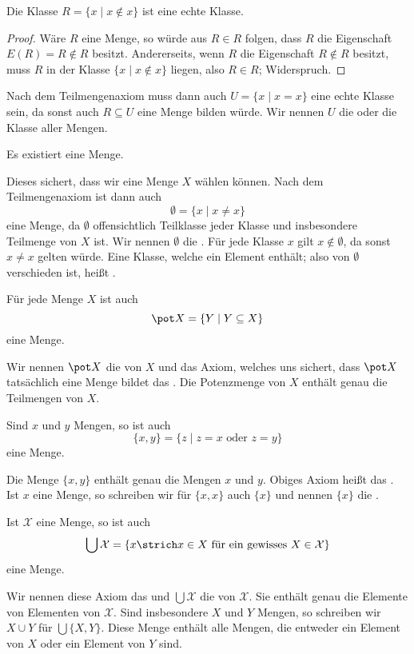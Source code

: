 \begin{lemma}
Die Klasse $R=\{x\mid x\notin x\}$ ist eine echte Klasse.
\begin{proof}
Wäre $R$ eine Menge, so würde aus $R\in R$ folgen, dass $R$ die Eigenschaft $E(R)=R\notin R$ besitzt. Andererseits, wenn $R$ die Eigenschaft $R\notin R$ besitzt, muss $R$ in der Klasse $\{x\mid x\notin x\}$ liegen, also $R\in R$; Widerspruch.
\end{proof}
\end{lemma}

Nach dem Teilmengenaxiom muss dann auch $U=\{x\mid x=x\}$ eine echte Klasse sein, da sonst auch $R\subseteq U$ eine Menge bilden würde. Wir nennen $U$ die  oder die Klasse aller Mengen.

\begin{axiom}
Es existiert eine Menge.
\end{axiom}

Dieses  sichert, dass wir eine Menge $X$ wählen können. Nach dem Teilmengenaxiom ist dann auch
\[\emptyset=\{x\mid x\not= x\}\] eine Menge, da $\emptyset$ offensichtlich Teilklasse jeder Klasse und insbesondere Teilmenge von $X$ ist. Wir nennen $\emptyset$ die . Für jede Klasse $x$ gilt $x\notin\emptyset$, da sonst $x\not= x$ gelten würde. Eine Klasse, welche ein Element enthält; also von $\emptyset$ verschieden ist, heißt .

\begin{axiom}
Für jede Menge $X$ ist auch
\[
\pot X=\{Y\mid Y\subseteq X\}
\]
eine Menge.
\end{axiom}
Wir nennen $\pot X$ die  von $X$ und das Axiom, welches uns sichert, dass $\pot X$ tatsächlich eine Menge bildet das . Die Potenzmenge von $X$ enthält genau die Teilmengen von $X$.

\begin{axiom}
Sind $x$ und $y$ Mengen, so ist auch
\[
\{x,y\}=\{z\mid z=x\text{ oder }z=y\}\]
eine Menge.
\end{axiom}
Die Menge $\{x,y\}$ enthält genau die Mengen $x$ und $y$. Obiges Axiom heißt das . Ist $x$ eine Menge, so schreiben wir für $\{x,x\}$ auch $\{x\}$ und nennen $\{x\}$ die .

\begin{axiom}
Ist $\mathcal{X}$ eine Menge, so ist auch
\[
\bigcup\mathcal{X}=\left\{x\strich x\in X\text{ für ein gewisses }X\in\mathcal{X}\right\}
\]
eine Menge.
\end{axiom}
Wir nennen diese Axiom das  und $\bigcup\mathcal{X}$ die  von $\mathcal{X}$. Sie enthält genau die Elemente von Elementen von $\mathcal{X}$. Sind insbesondere $X$ und $Y$ Mengen, so schreiben wir $X\cup Y$ für $\bigcup\{X,Y\}$. Diese Menge enthält alle Mengen, die entweder ein Element von $X$ oder ein Element von $Y$ sind.

